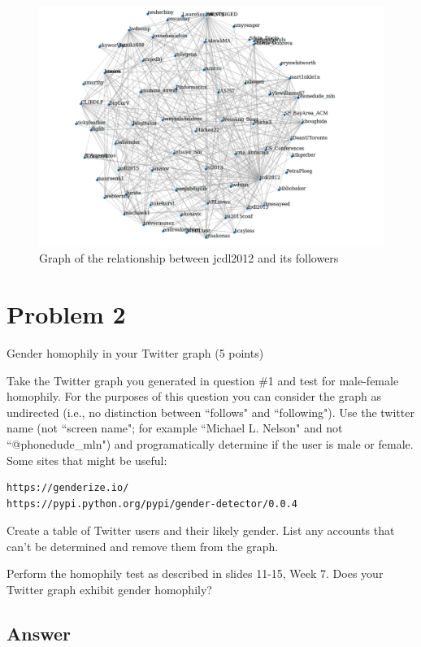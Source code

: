 \documentclass[12pt]{article}
\begin{document}


\begin{figure}[h]
\centering
\includegraphics[width=6.5in]{graph.png}
\caption{Graph of the relationship between jcdl2012 and its followers}
\end{figure}

\section*{Problem 2}
Gender homophily in your Twitter graph (5 points)

Take the Twitter graph you generated in question \#1 and test for
male-female homophily.  For the purposes of this question you can
consider the graph as undirected (i.e., no distinction between
``follows" and ``following").  Use the twitter name (not ``screen
name"; for example ``Michael L. Nelson" and not ``@phonedude\_mln")
and programatically determine if the user is male or female.  Some
sites that might be useful:

\begin{verbatim}
https://genderize.io/
https://pypi.python.org/pypi/gender-detector/0.0.4
\end{verbatim}


Create a table of Twitter users and their likely gender.  List any 
accounts that can't be determined and remove them from the graph.


Perform the homophily test as described in slides 11-15, Week 7. Does your Twitter graph exhibit gender homophily?


\subsection*{Answer}
\end{document}
